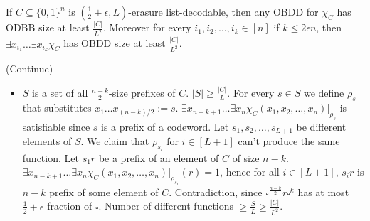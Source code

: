 {
\mylem If $C\subseteq \{0,1\}^n$ is $(\frac{1}{2}+\epsilon, L)$-erasure list-decodable, then any OBDD
for $\chi_C$ has ODBB size at least $\frac{|C|}{L^2}$. Moreover for every $i_1, i_2,\dots, i_k\in [n]$ if $k\le 2\epsilon n$,
then $\exists x_{i_1}\dots \exists x_{i_k} \chi_C$ has OBDD size at least $\frac{|C|}{L^2}$.

\dok (Continue)
\begin{itemize}
\item $S$ is a set of all $\frac{n-k}{2}$-size prefixes of $C$.
$|S|\ge \frac{|C|}{L}$.
\pitem For every $s\in S$ we define $\rho_s$ that substitutes $x_1\dots x_{(n-k)/2}:=s$.
$\exists x_{n-k+1}\dots \exists x_{n} \chi_C(x_1, x_2,\dots, x_n)|_{\rho_s}$ is satisfiable since $s$
is a prefix of a codeword.
\pitem Let $s_1, s_2,\dots, s_{L+1}$ be different elements of $S$. We claim that
$\rho_{s_i}$ for $i\in [L+1]$ can't produce the same function.
\pitem Let $s_1r$ be a prefix of an element of $C$ of size $n-k$.
\pitem $\exists x_{n-k+1}\dots \exists x_{n} \chi_C(x_1, x_2,\dots, x_n)|_{\rho_{s_1}}(r)=1$, hence
for all $i\in [L+1]$, $s_ir$ is $n-k$ prefix of some element of $C$. Contradiction, since
$\square^{\frac{n-k}{2}}r\square^{k}$ has at most $\frac{1}{2}+\epsilon$ fraction of $\square$.
\pitem Number of different functions $\ge\frac{S}{L}\ge \frac{|C|}{L^2}$.
\end{itemize}           
}

